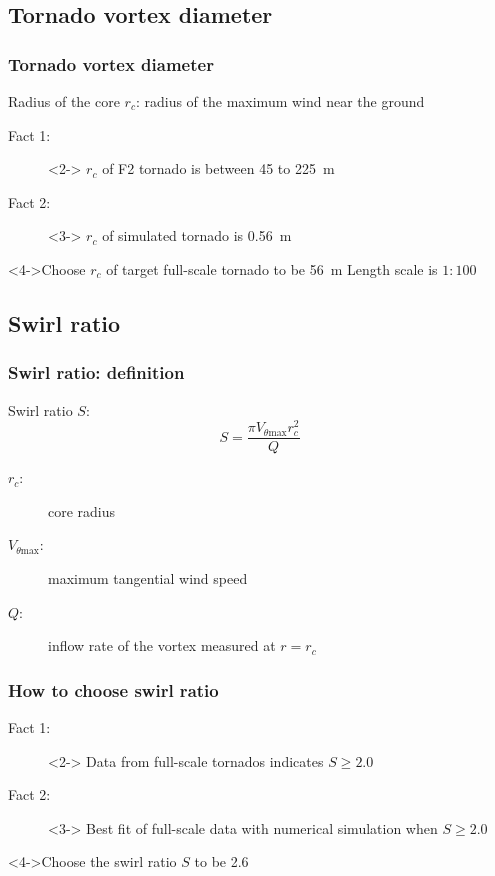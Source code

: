 \documentclass[handout]{beamer}
\begin{document}
\subsection{Tornado vortex diameter}

\begin{frame}
	\frametitle{Tornado vortex diameter}
	\begin{definition}
	 	\alert{Radius of the core $r_c$}: radius of the maximum wind near the ground
	\end{definition}
	\begin{description}
		\item[Fact 1: ]<2-> $r_c$ of F2 tornado is between \alert{\SI{45}{} to \SI{225}{m}}
		\item[Fact 2: ]<3-> $r_c$ of simulated tornado is \alert{\SI{0.56}{m}}
	\end{description}
	\begin{block}<4->{Choose $r_c$ of target full-scale tornado to be \alert{\SI{56}{m}}}
		   Length scale is $1:100$ 
	\end{block} 
\end{frame}

\subsection{Swirl ratio}

\begin{frame}
	\frametitle{Swirl ratio: definition}
	\begin{definition}
		\alert{Swirl ratio $S$}: 
		$$ S = \frac{\pi V_{\theta\mathrm{max}} r_c^2}{Q}$$
		\begin{description}
			\item[$r_c$: ] core radius
			\item[$V_{\theta\mathrm{max}}$: ] maximum tangential wind speed
			\item[$Q$: ] inflow rate of the vortex measured at $r=r_c$
		\end{description}
	\end{definition}
\end{frame}

\begin{frame}
	\frametitle{How to choose swirl ratio}
		\begin{description}
			\item[Fact 1: ] <2-> Data from full-scale tornados indicates \alert{$S\geqslant2.0$}
			\item[Fact 2: ]<3-> Best fit of full-scale data with numerical simulation when \alert{$S\geqslant2.0$}
		\end{description}
		\begin{block}<4->{Choose the swirl ratio $S$  to be \alert{\num{2.6}} }
			
		\end{block}
\end{frame}
\end{document}
